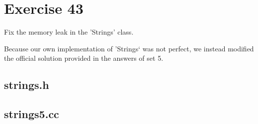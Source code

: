 \section*{Exercise 43}
\begin{question}
    Fix the memory leak in the 'Strings' class.
\end{question}

\begin{solution}
    Because our own implementation of 'Strings` was not perfect, we instead modified the official solution provided in the answers of set 5. 

    \subsection*{strings.h}
    \vspace{20pt}
    \subsection*{strings5.cc}
\end{solution}
